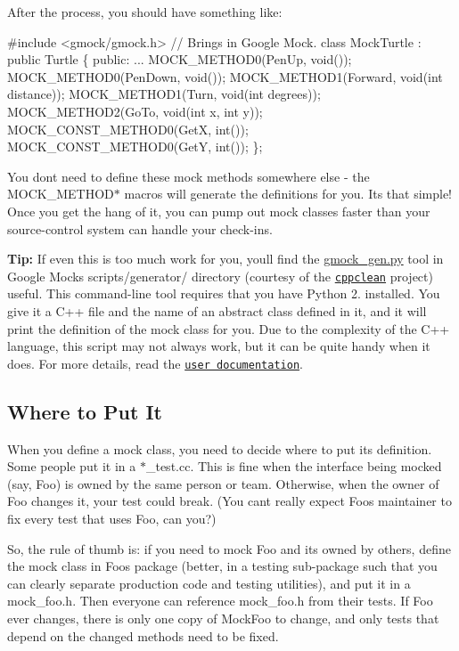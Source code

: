 After the process, you should have something like\+:


\begin{DoxyCode}
#include <gmock/gmock.h>  // Brings in Google Mock.
class MockTurtle : public Turtle \{
 public:
  ...
  MOCK\_METHOD0(PenUp, void());
  MOCK\_METHOD0(PenDown, void());
  MOCK\_METHOD1(Forward, void(int distance));
  MOCK\_METHOD1(Turn, void(int degrees));
  MOCK\_METHOD2(GoTo, void(int x, int y));
  MOCK\_CONST\_METHOD0(GetX, int());
  MOCK\_CONST\_METHOD0(GetY, int());
\};
\end{DoxyCode}


You don\textquotesingle{}t need to define these mock methods somewhere else -\/ the {\ttfamily M\+O\+C\+K\+\_\+\+M\+E\+T\+H\+O\+D$\ast$} macros will generate the definitions for you. It\textquotesingle{}s that simple! Once you get the hang of it, you can pump out mock classes faster than your source-\/control system can handle your check-\/ins.

{\bfseries Tip\+:} If even this is too much work for you, you\textquotesingle{}ll find the {\ttfamily \hyperlink{gmock__gen_8py}{gmock\+\_\+gen.\+py}} tool in Google Mock\textquotesingle{}s {\ttfamily scripts/generator/} directory (courtesy of the \href{http://code.google.com/p/cppclean/}{\tt cppclean} project) useful. This command-\/line tool requires that you have Python 2. installed. You give it a C++ file and the name of an abstract class defined in it, and it will print the definition of the mock class for you. Due to the complexity of the C++ language, this script may not always work, but it can be quite handy when it does. For more details, read the \href{http://code.google.com/p/googlemock/source/browse/trunk/scripts/generator/README}{\tt user documentation}.

\subsection*{Where to Put It}

When you define a mock class, you need to decide where to put its definition. Some people put it in a {\ttfamily $\ast$\+\_\+test.cc}. This is fine when the interface being mocked (say, {\ttfamily Foo}) is owned by the same person or team. Otherwise, when the owner of {\ttfamily Foo} changes it, your test could break. (You can\textquotesingle{}t really expect {\ttfamily Foo}\textquotesingle{}s maintainer to fix every test that uses {\ttfamily Foo}, can you?)

So, the rule of thumb is\+: if you need to mock {\ttfamily Foo} and it\textquotesingle{}s owned by others, define the mock class in {\ttfamily Foo}\textquotesingle{}s package (better, in a {\ttfamily testing} sub-\/package such that you can clearly separate production code and testing utilities), and put it in a {\ttfamily mock\+\_\+foo.\+h}. Then everyone can reference {\ttfamily mock\+\_\+foo.\+h} from their tests. If {\ttfamily Foo} ever changes, there is only one copy of {\ttfamily Mock\+Foo} to change, and only tests that depend on the changed methods need to be fixed.

